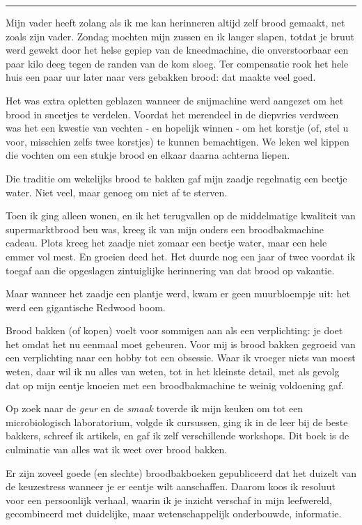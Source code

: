 \documentclass[
  11pt,
  dutch,
]{memoir}
\begin{document}
\pfbreak

Mijn vader heeft zolang als ik me kan herinneren altijd zelf brood
gemaakt, net zoals zijn vader. Zondag mochten mijn zussen en ik langer
slapen, totdat je bruut werd gewekt door het helse gepiep van de
kneedmachine, die onverstoorbaar een paar kilo deeg tegen de randen van
de kom sloeg. Ter compensatie rook het hele huis een paar uur later naar
vers gebakken brood: dat maakte veel goed.

Het was extra opletten geblazen wanneer de snijmachine werd aangezet om
het brood in sneetjes te verdelen. Voordat het merendeel in de diepvries
verdween was het een kwestie van vechten - en hopelijk winnen - om het
korstje (of, stel u voor, misschien zelfs twee korstjes) te kunnen
bemachtigen. We leken wel kippen die vochten om een stukje brood en
elkaar daarna achterna liepen.

Die traditie om wekelijks brood te bakken gaf mijn zaadje regelmatig een
beetje water. Niet veel, maar genoeg om niet af te sterven.

Toen ik ging alleen wonen, en ik het terugvallen op de middelmatige
kwaliteit van supermarktbrood beu was, kreeg ik van mijn ouders een
broodbakmachine cadeau. Plots kreeg het zaadje niet zomaar een beetje
water, maar een hele emmer vol mest. En groeien deed het. Het duurde nog
een jaar of twee voordat ik toegaf aan die opgeslagen zintuiglijke
herinnering van dat brood op vakantie.

Maar wanneer het zaadje een plantje werd, kwam er geen muurbloempje uit:
het werd een gigantische Redwood boom.

Brood bakken (of kopen) voelt voor sommigen aan als een verplichting: je
doet het omdat het nu eenmaal moet gebeuren. Voor mij is brood bakken
gegroeid van een verplichting naar een hobby tot een obsessie. Waar ik
vroeger niets van moest weten, daar wil ik nu alles van weten, tot in
het kleinste detail, met als gevolg dat op mijn eentje knoeien met een
broodbakmachine te weinig voldoening gaf.

Op zoek naar de \emph{geur} en de \emph{smaak} toverde ik mijn keuken om
tot een microbiologisch laboratorium, volgde ik cursussen, ging ik in de
leer bij de beste bakkers, schreef ik artikels, en gaf ik zelf
verschillende workshops. Dit boek is de culminatie van alles wat ik weet
over brood bakken.

Er zijn zoveel goede (en slechte) broodbakboeken gepubliceerd dat het
duizelt van de keuzestress wanneer je er eentje wilt aanschaffen. Daarom
koos ik resoluut voor een persoonlijk verhaal, waarin ik je inzicht
verschaf in mijn leefwereld, gecombineerd met duidelijke, maar
wetenschappelijk onderbouwde, informatie.
\end{document}
